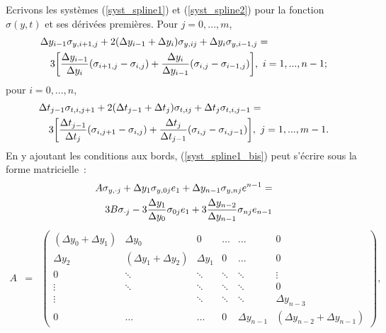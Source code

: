 Ecrivons les syst\`emes (\ref{syst_spline1}) et (\ref{syst_spline2}) 
pour la fonction $\sigma(y,t)$ et ses d\'eriv\'ees premi\`eres. Pour 
$j=0,...,m$, 
\begin{eqnarray}
\lefteqn{\Delta y_{i-1}\sigma_{y,i+1,j}+
2(\Delta y_{i-1}+\Delta y_i)\sigma_{y,ij} + 
\Delta y_i \sigma_{y,i-1,j} = } \nonumber \\
&& 3\biggl [ \frac{\Delta y_{i-1}}{\Delta y_i}
(\sigma_{i+1,j}-\sigma_{i,j}) + \frac{\Delta y_i}{\Delta y_{i-1}}
(\sigma_{i,j}-\sigma_{i-1,j})\biggr ],~ i=1,...,n-1;
\label{syst_spline1_bis}
\end{eqnarray}
pour $i=0,...,n$, 
\begin{eqnarray}
\lefteqn{\Delta t_{j-1}\sigma_{t,i,j+1}+
2(\Delta t_{j-1}+\Delta t_j)\sigma_{t,ij} + 
\Delta t_j \sigma_{t,i,j-1} = } \nonumber \\
&& 3\biggl [ \frac{\Delta t_{j-1}}{\Delta t_j}
(\sigma_{i,j+1}-\sigma_{i,j}) + \frac{\Delta t_j}{\Delta t_{j-1}}
(\sigma_{i,j}-\sigma_{i,j-1})\biggr ],~ j=1,...,m-1.
\label{syst_spline2_bis}
\end{eqnarray}
En y ajoutant les conditions aux bords, (\ref{syst_spline1_bis}) peut 
s'\'ecrire sous la forme matricielle~: 
\begin{eqnarray}
\lefteqn{A\sigma_{y,\cdot j} + \Delta y_1 \sigma_{y,0j}e_1 + 
\Delta y_{n-1}\sigma_{y,nj}e^{n-1}=}\nonumber \\
&& 3B\sigma_{\cdot j}-3\frac{\Delta y_1}{\Delta y_0}\sigma_{0j}e_1 + 
3\frac{\Delta y_{n-2}}{\Delta y_{n-1}}\sigma_{nj}e_{n-1}
\end{eqnarray}
\begin{eqnarray*}
A &=& \begin{pmatrix}
(\Delta y_0 + \Delta y_1) & \Delta y_0 & 0 & \ldots & \ldots & 0 \\
\Delta y_2 & (\Delta y_1+\Delta y_2) &\Delta y_1 & 0 & \ldots & 0 \\
0 & \ddots & \ddots & \ddots & \ddots & \vdots \\
\vdots & \ddots & \ddots & \ddots & \ddots & 0 \\
\vdots &  & \ddots & \ddots & \ddots & \Delta y_{n-3}\\
0 & \ldots & \ldots & 0 & \Delta y_{n-1} & 
(\Delta y_{n-2}+\Delta y_{n-1})
\end{pmatrix},
\end{eqnarray*}
